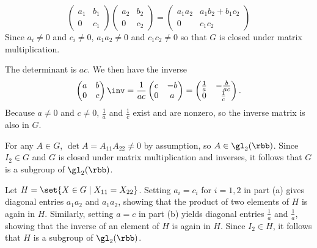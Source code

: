\begin{solenum}
    \item 
    \[
        \begin{pmatrix}
            a_1 & b_1 \\
            0 & c_1
        \end{pmatrix}
        \begin{pmatrix}
            a_2 & b_2 \\
            0 & c_2
        \end{pmatrix} = 
        \begin{pmatrix}
            a_1a_2 & a_1b_2 + b_1c_2 \\
            0 & c_1c_2
        \end{pmatrix}
	\]
    Since $a_i \neq 0$ and $c_i \neq 0$, $a_1a_2 \neq 0$ and $c_1c_2 \neq 0$ so that $G$ is closed under matrix multiplication.
    \item The determinant is $ac$.
	We then have the inverse
    \[
        \begin{pmatrix}
            a & b \\
            0 & c
        \end{pmatrix}\inv = 
        \frac{1}{ac}
        \begin{pmatrix}
            c & -b \\
            0 & a
        \end{pmatrix} = 
        \begin{pmatrix}
            \frac{1}{a} & -\frac{b}{ac} \\
            0 & \frac{1}{c}
        \end{pmatrix}.
    \]
    Because $a \neq 0$ and $c \neq 0$, $\frac{1}{a}$ and $\frac{1}{c}$ exist and are nonzero, so the inverse matrix is also in $G$.
    \item For any $A \in G$, $\det A = A_{11}A_{22} \neq 0$ by assumption, so $A \in \gl_2(\rbb)$.
    Since $I_2 \in G$ and $G$ is closed under matrix multiplication and inverses, it follows that $G$ is a subgroup of $\gl_2(\rbb)$.
    \item Let $H = \set{X \in G \mid X_{11} = X_{22}}$.
    Setting $a_i = c_i$ for $i = 1, 2$ in part (a) gives diagonal entries $a_1a_2$ and $a_1a_2$, showing that the product of two elements of $H$ is again in $H$.
    Similarly, setting $a = c$ in part (b) yields diagonal entries $\frac{1}{a}$ and $\frac{1}{a}$, showing that the inverse of an element of $H$ is again in $H$.
    Since $I_2 \in H$, it follows that $H$ is a subgroup of $\gl_2(\rbb)$.
\end{solenum}

